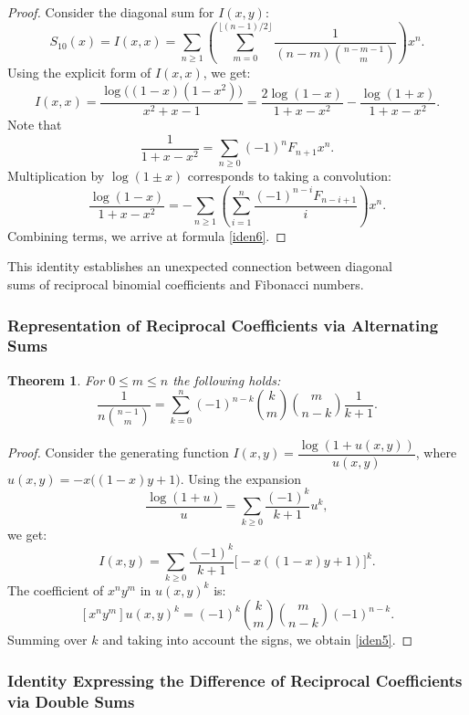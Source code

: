 \documentclass[12pt]{article}
\newtheorem{theorem}{Theorem}[section]
\begin{document}
\begin{proof}
 Consider the diagonal sum for \( I(x,y) \):
\[
S_{10}(x) = I(x,x) = \sum_{n\geq 1}\left(
\sum_{m=0}^{\lfloor (n-1)/2 \rfloor} \frac{1}{(n-m)\binom{n-m-1}{m}}
\right)x^n.
\]
Using the explicit form of \( I(x,x) \), we get:
\[
I(x,x) = \frac{\log\!\bigl((1-x)(1-x^2)\bigr)}{x^2+x-1}
= \frac{2\log(1-x)}{1+x-x^2} - \frac{\log(1+x)}{1+x-x^2}.
\]
Note that
\[
\frac{1}{1+x-x^2} = \sum_{n\geq 0} (-1)^n F_{n+1} x^n.
\]
Multiplication by \( \log(1\pm x) \) corresponds to taking a convolution:
\[
\frac{\log(1-x)}{1+x-x^2} = -\sum_{n\geq 1}\left(
\sum_{i=1}^n \frac{(-1)^{n-i} F_{n-i+1}}{i}
\right)x^n.
\]
Combining terms, we arrive at formula \eqref{iden6}.
\end{proof}

This identity establishes an unexpected connection between diagonal\\ sums of reciprocal binomial coefficients and Fibonacci numbers.

\subsubsection{Representation of Reciprocal Coefficients via Alternating Sums}

\begin{theorem}
For \( 0 \leq m \leq n \) the following holds:
\begin{equation}\label{iden5}
\frac{1}{n\binom{n-1}{m}}
= \sum_{k=0}^n (-1)^{n-k} \binom{k}{m}\binom{m}{n-k}\frac{1}{k+1}.
\end{equation}
\end{theorem}

\begin{proof}
 Consider the generating function \( I(x,y) = \dfrac{\log(1+u(x,y))}{u(x,y)} \), where
\( u(x,y) = -x\bigl((1-x)y+1\bigr) \).
Using the expansion
\[
\frac{\log(1+u)}{u} = \sum_{k\geq 0} \frac{(-1)^k}{k+1} u^k,
\]
we get:
\[
I(x,y) = \sum_{k\geq 0} \frac{(-1)^k}{k+1} \bigl[-x((1-x)y+1)\bigr]^k.
\]
The coefficient of \( x^n y^m \) in \( u(x,y)^k \) is:
\[
[x^n y^m] u(x,y)^k = (-1)^k \binom{k}{m} \binom{m}{n-k} (-1)^{n-k}.
\]
Summing over \( k \) and taking into account the signs, we obtain \eqref{iden5}.
\end{proof}

\subsubsection{Identity Expressing the Difference of Reciprocal Coefficients via Double Sums}
\end{document}
